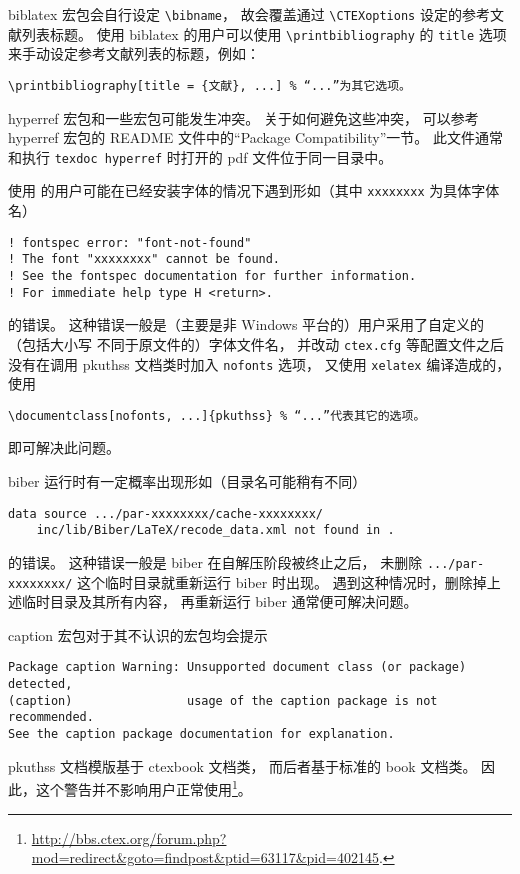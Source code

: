 	biblatex\supercite{biblatex} 宏包会自行设定 \verb|\bibname|，
	故会覆盖通过 \verb|\CTEXoptions| 设定的参考文献列表标题。
	使用 biblatex 的用户可以使用 \verb|\printbibliography| 的
	\verb|title| 选项来手动设定参考文献列表的标题，例如：
\begin{Verbatim}[frame = single]
\printbibliography[title = {文献}, ...] % “...”为其它选项。
\end{Verbatim}

	hyperref\supercite{hyperref} 宏包和一些宏包可能发生冲突。
	关于如何避免这些冲突，
	可以参考 hyperref 宏包的 README 文件中的“Package Compatibility”一节。
	此文件通常和执行 \verb|texdoc hyperref| %
	时打开的 pdf 文件位于同一目录中。

	使用  的用户可能在已经安装字体的情况下遇到形如（其中
	\verb|xxxxxxxx| 为具体字体名）
\begin{Verbatim}[frame = single, fontsize = {\small}]
! fontspec error: "font-not-found"
! The font "xxxxxxxx" cannot be found.
! See the fontspec documentation for further information.
! For immediate help type H <return>.
\end{Verbatim}
	的错误。
	这种错误一般是（主要是非 Windows 平台的）用户采用了自定义的（包括大小写
	不同于原文件的）字体文件名，
	并改动 \verb|ctex.cfg| 等配置文件之后没有在调用 %
	pkuthss 文档类时加入 \verb|nofonts| 选项，
	又使用 \verb|xelatex| 编译造成的，使用
\begin{Verbatim}[frame = single]
\documentclass[nofonts, ...]{pkuthss} % “...”代表其它的选项。
\end{Verbatim}
	即可解决此问题。

	biber 运行时有一定概率出现形如（目录名可能稍有不同）
\begin{Verbatim}[frame = single, fontsize = {\small}]
data source .../par-xxxxxxxx/cache-xxxxxxxx/
	inc/lib/Biber/LaTeX/recode_data.xml not found in .
\end{Verbatim}
	的错误。
	这种错误一般是 biber 在自解压阶段被终止之后，
	未删除 \verb|.../par-xxxxxxxx/| 这个临时目录就重新运行 biber 时出现。
	遇到这种情况时，删除掉上述临时目录及其所有内容，
	再重新运行 biber 通常便可解决问题。

	caption\supercite{caption} 宏包对于其不认识的宏包均会提示
\begin{Verbatim}[frame = single, fontsize = {\small}]
Package caption Warning: Unsupported document class (or package) detected,
(caption)                usage of the caption package is not recommended.
See the caption package documentation for explanation.
\end{Verbatim}
	pkuthss 文档模版基于 ctexbook 文档类，
	而后者基于标准的 book 文档类。
	因此，这个警告并不影响用户正常使用\footnote{%
		\url{http://bbs.ctex.org/forum.php?mod=redirect&goto=findpost&ptid=63117&pid=402145}.%
	}。


